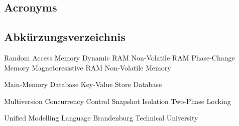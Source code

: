 %
%
%
%
\begin{en}
\chapter{Acronyms}
\end{en}
\begin{de}
\chapter{Abk\"urzungsverzeichnis}
\end{de}
\label{sec:acronyms}
%
\begin{multicols}{2}
\begin{acronym}[NVRAM]		%
%
%
	 {Random Access Memory}
	 {Dynamic RAM}
	 {Non-Volatile RAM}
	 {Phase-Change Memory}
	 {Magnetoresistive RAM}
	 {Non-Volatile Memory}

     {Main-Memory Database}
     {Key-Value Store}
     {Database}

     {Multiversion Concurrency Control}
     {Snapshot Isolation}
     {Two-Phase Locking}

	 {Unified Modelling Language}
	 {Brandenburg Technical University}
%
%
\end{acronym}
\end{multicols}
%
%
%
